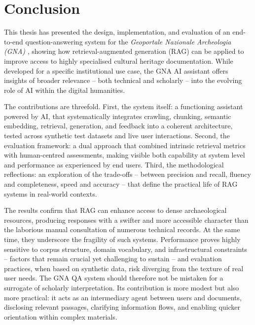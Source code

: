 \chapter{Conclusion}
\label{chap:conclusion}
\begin{spacing}{1.5}
This thesis has presented the design, implementation, and evaluation of an end-to-end question-answering system for the \textit{Geoportale Nazionale Archeologia (GNA)} \citep{gna_wiki_2024}, showing how retrieval-augmented generation (RAG) can be applied to improve access to highly specialised cultural heritage documentation. While developed for a specific institutional use case, the GNA AI assistant offers insights of broader relevance -- both technical and scholarly -- into the evolving role of AI within the digital humanities.

The contributions are threefold. First, the system itself: a functioning assistant powered by AI, that systematically integrates crawling, chunking, semantic embedding, retrieval, generation, and feedback into a coherent architecture, tested across synthetic test datasets and live user interactions. Second, the evaluation framework: a dual approach that combined intrinsic retrieval metrics with human-centred assessments, making visible both capability at system level and performance as experienced by end users. Third, the methodological reflections: an exploration of the trade-offs -- between precision and recall, fluency and completeness, speed and accuracy -- that define the practical life of RAG systems in real-world contexts.

The results confirm that RAG can enhance access to dense archaeological resources, producing responses with a swifter and more accessible character than the laborious manual consultation of numerous technical records. At the same time, they underscore the fragility of such systems. Performance proves highly sensitive to corpus structure, domain vocabulary, and infrastructural constraints -- factors that remain crucial yet challenging to sustain -- and evaluation practices, when based on synthetic data, risk diverging from the texture of real user needs. The GNA QA system should therefore not be mistaken for a surrogate of scholarly interpretation. Its contribution is more modest but also more practical: it acts as an intermediary agent between users and documents, disclosing relevant passages, clarifying information flows, and enabling quicker orientation within complex materials.


\end{spacing}
